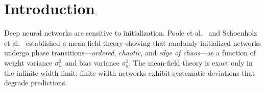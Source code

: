 \documentclass[10pt]{article}
\begin{document}
\section{Introduction}
\label{sec:intro}

Deep neural networks are sensitive to initialization.
Poole et al.~\cite{poole2016exponential} and Schoenholz et al.~\cite{schoenholz2017deep} established a mean-field theory showing that randomly initialized networks undergo phase transitions---\emph{ordered}, \emph{chaotic}, and \emph{edge of chaos}---as a function of weight variance $\sigma_w^2$ and bias variance $\sigma_b^2$.
The mean-field theory is exact only in the infinite-width limit; finite-width networks exhibit systematic deviations that degrade predictions.
\end{document}
